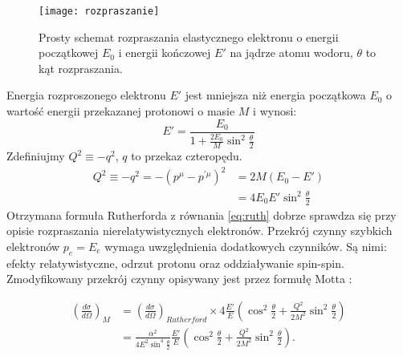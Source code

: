 \documentclass[11pt]{book}
\theoremstyle{definition}
\begin{document}
\begin{figure}[htp!]
	\centering
\texttt{[image: rozpraszanie]}
	\caption{Prosty schemat rozpraszania elastycznego elektronu o energii początkowej $E_0$  i energii kończowej $E'$ na jądrze atomu wodoru, $\theta$ to kąt rozpraszania.}
	\label{fig:scactter}
\end{figure}
%
Energia rozproszonego elektronu $E'$ jest mniejsza niż energia początkowa $E_0$ o wartość energii przekazanej protonowi o masie $M$ i wynosi:
%
\begin{equation}
E' = \frac{E_0}{1 + \frac{2E_0}{M}\sin^2 \frac{\theta}{2}}
\end{equation}
%
Zdefiniujmy $ Q^2 \equiv - q^2 $, $q$ to przekaz czteropędu.
%
\begin{equation}
\begin{split}
Q^2 \equiv - q^2 = -(p^{\mu} - p^{'\mu})^2 &= 2M\left(E_0 - E'\right) \\
& = 4 E_0 E' \sin^2 \frac{\theta}{2}
\end{split}
\end{equation}
%
Otrzymana formuła Rutherforda z równania \ref{eq:ruth} dobrze sprawdza się przy opisie rozpraszania nierelatywistycznych elektronów. Przekrój czynny szybkich elektronów $p_e = E_e$ wymaga uwzględnienia dodatkowych czynników. Są nimi: efekty relatywistyczne, odrzut protonu oraz oddziaływanie spin-spin. Zmodyfikowany przekrój czynny opisywany jest przez formułę Motta \cite{10.1088/978-0-7503-1140-3}:



\begin{equation}
\begin{split}
\left( \frac{d\sigma}{d\Omega} \right)_M  &= \left( \frac{d\sigma}{d\Omega} \right)_{Rutherford} \times 4\frac{E'}{E}\left( \cos^2 \frac{\theta}{2} + \frac{Q^2}{2M^2}\sin^2\frac{\theta}{2}\right) \\ 
& =  \frac{\alpha^2 }{4E^2\sin^4 \frac{\theta}{2}} \frac{E'}{E} \left( \cos^2 \frac{\theta}{2} + \frac{Q^2}{2M^2}\sin^2\frac{\theta}{2}\right). \label{eq:mott}
\end{split}
\end{equation}


\end{document}
